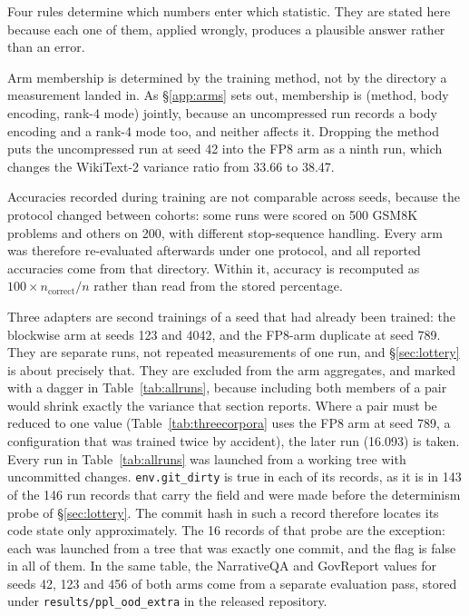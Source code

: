 \documentclass[11pt,letterpaper]{article}
\begin{document}
Four rules determine which numbers enter which statistic. They are stated here because each one of them, applied wrongly, produces a plausible answer rather than an error.

\medskip
Arm membership is determined by the training method, not by the directory a measurement landed in. As \S\ref{app:arms} sets out, membership is (method, body encoding, rank-4 mode) jointly, because an uncompressed run records a body encoding and a rank-4 mode too, and neither affects it. Dropping the method puts the uncompressed run at seed 42 into the FP8 arm as a ninth run, which changes the WikiText-2 variance ratio from 33.66 to 38.47.

\medskip
Accuracies recorded during training are not comparable across seeds, because the protocol changed between cohorts: some runs were scored on 500 GSM8K problems and others on 200, with different stop-sequence handling. Every arm was therefore re-evaluated afterwards under one protocol, and all reported accuracies come from that directory. Within it, accuracy is recomputed as $100 \times n_{\mathrm{correct}}/n$ rather than read from the stored percentage.

\medskip
Three adapters are second trainings of a seed that had already been trained: the blockwise arm at seeds 123 and 4042, and the FP8-arm duplicate at seed 789. They are separate runs, not repeated measurements of one run, and \S\ref{sec:lottery} is about precisely that. They are excluded from the arm aggregates, and marked with a dagger in Table~\ref{tab:allruns}, because including both members of a pair would shrink exactly the variance that section reports. Where a pair must be reduced to one value (Table~\ref{tab:threecorpora} uses the FP8 arm at seed 789, a configuration that was trained twice by accident), the later run (16.093) is taken. Every run in Table~\ref{tab:allruns} was launched from a working tree with uncommitted changes. \texttt{env.git\_dirty} is true in each of its records, as it is in 143 of the 146 run records that carry the field and were made before the determinism probe of \S\ref{sec:lottery}. The commit hash in such a record therefore locates its code state only approximately. The 16 records of that probe are the exception: each was launched from a tree that was exactly one commit, and the flag is false in all of them. In the same table, the NarrativeQA and GovReport values for seeds 42, 123 and 456 of both arms come from a separate evaluation pass, stored under \texttt{results/ppl\_ood\_extra} in the released repository.
\end{document}
